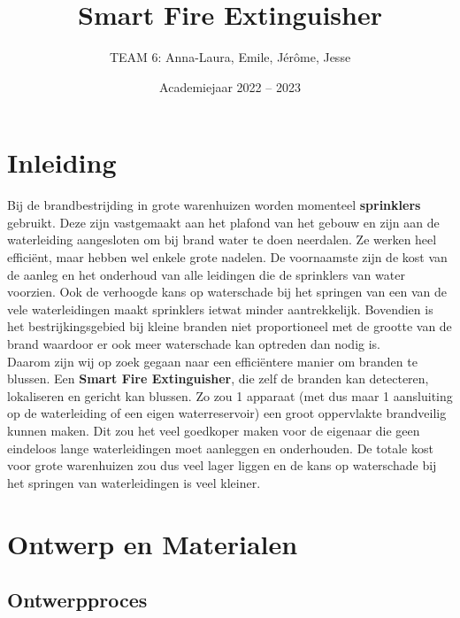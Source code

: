 \documentclass[kulak]{kulakarticle} %
\title{Smart Fire Extinguisher}
\author{TEAM 6: Anna-Laura, Emile, Jérôme, Jesse}
\date{Academiejaar 2022 -- 2023}
\begin{document}
\maketitle



\section*{Inleiding}        
Bij de brandbestrijding in grote warenhuizen worden momenteel \textbf{sprinklers} gebruikt. Deze zijn vastgemaakt aan het plafond van het gebouw en zijn aan de waterleiding aangesloten om bij brand water te doen neerdalen. Ze werken heel efficiënt, maar hebben wel enkele grote nadelen. De voornaamste zijn de kost van de aanleg en het onderhoud van alle leidingen die de sprinklers van water voorzien. Ook de verhoogde kans op waterschade bij het springen van een van de vele waterleidingen maakt sprinklers ietwat minder aantrekkelijk. Bovendien is het bestrijkingsgebied bij kleine branden niet proportioneel met de grootte van de brand waardoor er ook meer waterschade kan optreden dan nodig is. \\

Daarom zijn wij op zoek gegaan naar een efficiëntere manier om branden te blussen. Een \textbf{Smart Fire Extinguisher}, die zelf de branden kan detecteren, lokaliseren en gericht kan blussen. Zo zou 1 apparaat (met dus maar 1 aansluiting op de waterleiding of een eigen waterreservoir) een groot oppervlakte brandveilig kunnen maken. Dit zou het veel goedkoper maken voor de eigenaar die geen eindeloos lange waterleidingen moet aanleggen en onderhouden. De totale kost voor grote warenhuizen zou dus veel lager liggen en de kans op waterschade bij het springen van waterleidingen is veel kleiner.


\section{Ontwerp en Materialen}
\subsection{Ontwerpproces}
\end{document}
